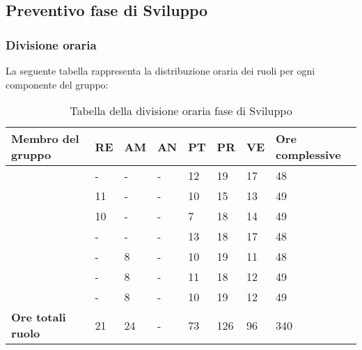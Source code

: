 \subsection{Preventivo fase di Sviluppo}

\subsubsection{Divisione oraria}
La seguente tabella rappresenta la distribuzione oraria dei ruoli per ogni componente del gruppo:
{
	\renewcommand{\arraystretch}{2}
	\begin{longtable}[h!] { C{4cm} C{1cm} C{1cm} C{1cm} C{1cm} C{1cm} C{1cm} C{3cm}}
	\caption{Tabella della divisione oraria fase di Sviluppo}\\
	\rowcolor{\primaryColor}
	
	\textcolor{\secondaryColor}{\textbf{Membro del gruppo}} & 
	\textcolor{\secondaryColor}{\textbf{RE}} & 
	\textcolor{\secondaryColor}{\textbf{AM}} & 
	\textcolor{\secondaryColor}{\textbf{AN}} & 
	\textcolor{\secondaryColor}{\textbf{PT}} & 
	\textcolor{\secondaryColor}{\textbf{PR}} & 
	\textcolor{\secondaryColor}{\textbf{VE}} & 
	\textcolor{\secondaryColor}{\textbf{Ore complessive}}\\	
	\endhead
	
	\AW{}                     & - & - & - & 12 & 19 & 17 & 48 \\
	\AT{}                     & 11 & - & - & 10 & 15 & 13 & 49 \\
	\AD{}                     & 10 & - & - & 7 & 18 & 14 & 49 \\
	\EC{}                     & - & - & - & 13 & 18 & 17 & 48 \\
	\EM{}                     & - & 8 & - & 10 & 19 & 11 & 48 \\
	\FP{}                     & - & 8 & - & 11 & 18 & 12 & 49 \\
	\GG{}                     & - & 8 & - & 10 & 19 & 12 & 49 \\
	\textbf{Ore totali ruolo} & 21 & 24 & - & 73 & 126 & 96 & 340\\
	
	\end{longtable}
}


